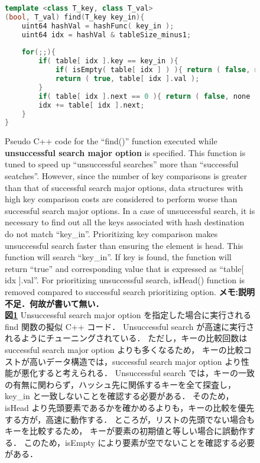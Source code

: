 \begin{figure}%
\begin{lstlisting}[language=C++]
template <class T_key, class T_val>
(bool, T_val) find(T_key key_in){
	uint64 hashVal = hashFunc( key_in );
	uint64 idx = hashVal & tableSize_minus1;
	
	for(;;){
		if( table[ idx ].key == key_in ){
			if( isEmpty( table[ idx ] ) ){ return ( false, none ); }
			return ( true, table[ idx ].val );
		}
		if( table[ idx ].next == 0 ){ return ( false, none ); }
		idx += table[ idx ].next;
	}
}
\end{lstlisting}
\caption{
  Pseudo C++ code for the ``find()'' function executed while {\bf unsuccessful search major option} is specified.
  This function is tuned to speed up ``unsuccessful searches'' more than ``successful seatches''.
  However, since the number of key comparisons is greater than that of successful search major options,
  data structures with high key comparison costs are considered to perform worse than successful search major options.
  In a case of unsuccessful search, it is necessary to find out all the keys associated with hash destination do not match ``key\_in''.
  Prioritizing key comparison makes unsuccessful search faster than ensuring the element is head.
  This function will search ``key\_in''.
  If key is found, the function will return ``true'' and corresponding value that is expressed as ``table[ idx ].val''.
  For prioritizing unsuccessful search, isHead() function is removed compared to successful search prioritizing option.
  {\bf \color{red}メモ:説明不足．何故が書いて無い．}
  \\
  {\bf 図\ref{alg_find_usm}}
  Unsuccessful search major option を指定した場合に実行される find 関数の擬似 C++ コード．
  Unsuccessful search が高速に実行されるようにチューニングされている．
  ただし，キーの比較回数は successful search major option よりも多くなるため，
  キーの比較コストが高いデータ構造では，successful search major option より性能が悪化すると考えられる．
  Unsuccessful search では，キーの一致の有無に関わらず，ハッシュ先に関係するキーを全て探査し，key\_in と一致しないことを確認する必要がある．
  そのため，isHead より先頭要素であるかを確かめるよりも，キーの比較を優先する方が，高速に動作する．
  ところが，リストの先頭でない場合もキーを比較するため，
  キーが要素の初期値と等しい場合に誤動作する．
  このため，isEmpty により要素が空でないことを確認する必要がある．
}
\label{alg_find_usm}
\end{figure}

